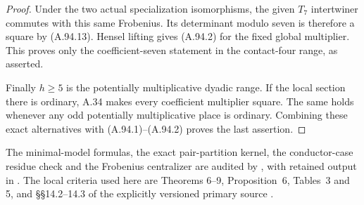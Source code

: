 \begin{proof}
Under the two actual specialization
isomorphisms, the given $T_7$ intertwiner
commutes with this same Frobenius.
Its determinant modulo seven is therefore
a square by (A.94.13).
Hensel lifting gives (A.94.2) for the fixed
global multiplier.  This proves only the
coefficient-seven statement in the contact-four
range, as asserted.

Finally $h\ge5$ is the potentially
multiplicative dyadic range.
If the local section there is ordinary,
A.34 makes every coefficient multiplier
square.  The same holds whenever any odd
potentially multiplicative place is ordinary.
Combining these exact alternatives with
(A.94.1)--(A.94.2) proves the last assertion.
\end{proof}

The minimal-model formulas, the exact
pair-partition kernel, the conductor-case
residue check and the Frobenius centralizer
are audited by
,
with retained output in
.
The local criteria used here are Theorems
6--9, Proposition~6, Tables~3 and 5,
and \S\S14.2--14.3 of the explicitly
versioned primary source
\cite{LegFreitasKraus2022}.
